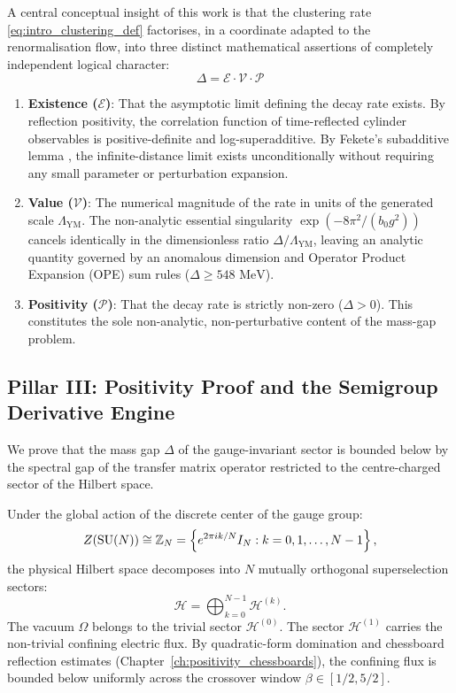 A central conceptual insight of this work is that the clustering rate \eqref{eq:intro_clustering_def} factorises, in a coordinate adapted to the renormalisation flow, into three distinct mathematical assertions of completely independent logical character:
\begin{equation}
\label{eq:three_factor_intro}
\boxed{
\Delta = \mathcal{E} \cdot \mathcal{V} \cdot \mathcal{P}
}
\end{equation}
\begin{enumerate}
    \item \textbf{Existence ($\mathcal{E}$)}: That the asymptotic limit defining the decay rate exists. By reflection positivity, the correlation function of time-reflected cylinder observables is positive-definite and log-superadditive. By Fekete's subadditive lemma \cite{Fekete1923}, the infinite-distance limit exists unconditionally without requiring any small parameter or perturbation expansion.
    \item \textbf{Value ($\mathcal{V}$)}: The numerical magnitude of the rate in units of the generated scale $\Lambda_{\mathrm{YM}}$. The non-analytic essential singularity $\exp(-8\pi^2/(b_0 g^2))$ cancels identically in the dimensionless ratio $\Delta / \Lambda_{\mathrm{YM}}$, leaving an analytic quantity governed by an anomalous dimension and Operator Product Expansion (OPE) sum rules ($\Delta \ge 548\text{ MeV}$).
    \item \textbf{Positivity ($\mathcal{P}$)}: That the decay rate is strictly non-zero ($\Delta > 0$). This constitutes the sole non-analytic, non-perturbative content of the mass-gap problem.
\end{enumerate}

\subsection{Pillar III: Positivity Proof and the Semigroup Derivative Engine}
\label{subsec:pillar_III}
We prove that the mass gap $\Delta$ of the gauge-invariant sector is bounded below by the spectral gap of the transfer matrix operator restricted to the centre-charged sector of the Hilbert space.

Under the global action of the discrete center of the gauge group:
\begin{equation}
Z(\mathrm{SU}(N)) \cong \mathbb{Z}_N = \left\{ e^{2\pi i k / N} I_N : k = 0, 1, \dots, N-1 \right\},
\end{equation}
the physical Hilbert space decomposes into $N$ mutually orthogonal superselection sectors:
\begin{equation}
\mathcal{H} = \bigoplus_{k=0}^{N-1} \mathcal{H}^{(k)}.
\end{equation}
The vacuum $\Omega$ belongs to the trivial sector $\mathcal{H}^{(0)}$. The sector $\mathcal{H}^{(1)}$ carries the non-trivial confining electric flux. By quadratic-form domination and chessboard reflection estimates (Chapter~\ref{ch:positivity_chessboards}), the confining flux is bounded below uniformly across the crossover window $\beta \in [1/2, 5/2]$.

